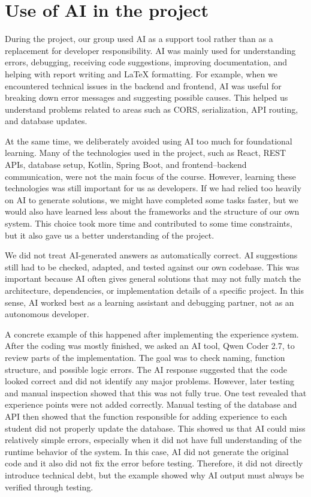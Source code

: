 \section{Use of AI in the project}

During the project, our group used AI as a support tool rather than as a replacement for developer responsibility.
AI was mainly used for understanding errors, debugging, receiving code suggestions, improving documentation, and helping with report writing and LaTeX formatting. 
For example, when we encountered technical issues in the backend and frontend, AI was useful for breaking down error messages and suggesting possible causes. 
This helped us understand problems related to areas such as CORS, serialization, API routing, and database updates.

At the same time, we deliberately avoided using AI too much for foundational learning.
Many of the technologies used in the project, such as React, REST APIs, database setup, Kotlin,
Spring Boot, and frontend--backend communication, were not the main focus of the course.
However, learning these technologies was still important for us as developers.
If we had relied too heavily on AI to generate solutions,
we might have completed some tasks faster, but we would also have learned less about the frameworks and the structure of our own system. 
This choice took more time and contributed to some time constraints, but it also gave us a better understanding of the project.

We did not treat AI-generated answers as automatically correct.
AI suggestions still had to be checked, adapted, and tested against our own codebase.
This was important because AI often gives general solutions that may not fully match the architecture, dependencies, or implementation details of a specific project.
In this sense, AI worked best as a learning assistant and debugging partner, not as an autonomous developer.

A concrete example of this happened after implementing the experience system.
After the coding was mostly finished, we asked an AI tool,
Qwen Coder 2.7, to review parts of the implementation.
The goal was to check naming, function structure, and possible logic errors.
The AI response suggested that the code looked correct and did not identify any major problems.
However, later testing and manual inspection showed that this was not fully true.
One test revealed that experience points were not added correctly. 
Manual testing of the database and API then showed that the function responsible for adding experience to each student did not properly update the database. 
This showed us that AI could miss relatively simple errors, especially when it did not have full understanding of the runtime behavior of the system. 
In this case, AI did not generate the original code and it also did not fix the error before testing.
Therefore, it did not directly introduce technical debt,
but the example showed why AI output must always be verified through testing.

